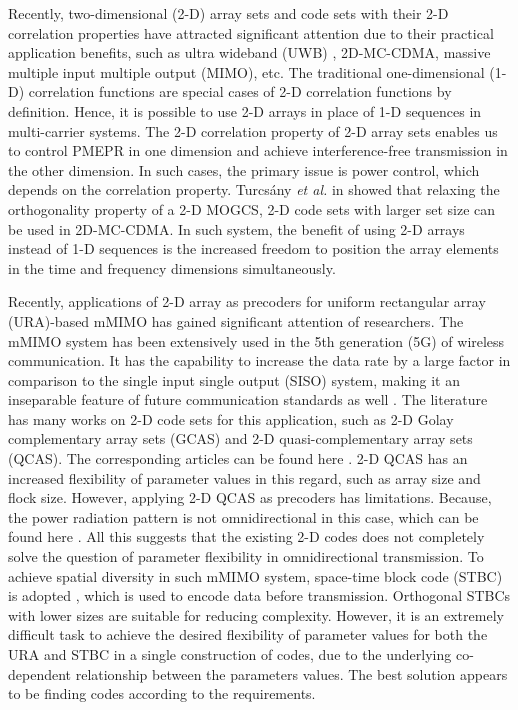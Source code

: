 \documentclass[pdflatex,sn-mathphys-num]{sn-jnl}%
\theoremstyle{thmstyleone}
\begin{document}
	Recently, two-dimensional (2-D) array sets and code sets with their 2-D correlation properties have attracted significant attention due to their practical application benefits, such as ultra wideband (UWB) \cite{Zhang2DMOGCS,XengZCACS}, 2D-MC-CDMA, massive multiple input multiple output (MIMO), etc. The traditional one-dimensional (1-D) correlation functions are special cases of 2-D correlation functions by definition. Hence, it is possible to use 2-D arrays in place of 1-D sequences in multi-carrier systems. The 2-D correlation property of 2-D array sets enables us to control PMEPR in one dimension and achieve interference-free transmission in the other dimension. In such cases, the primary issue is power control, which depends on the correlation property. 
	Turcs{\'a}ny \textit{et al.} in \cite{Turcsny2004New2T,turcsanyQCAS} showed that relaxing the orthogonality property of a 2-D MOGCS, 2-D code sets with larger set size can be used in 2D-MC-CDMA. In such system, the benefit of using 2-D arrays instead of 1-D sequences is the increased freedom to position the array elements in the time and frequency dimensions simultaneously.
	
	Recently, applications of 2-D array as precoders for uniform rectangular array (URA)-based mMIMO \cite{Omni1} has gained significant attention of researchers. The mMIMO system has been extensively used in the 5th generation (5G) of wireless communication. It has the capability to increase the data rate by a large factor in comparison to the single input single output (SISO) system, making it an inseparable feature of future communication standards as well \cite{6Gsurvey}. The literature has many works on 2-D code sets for this application, such as 2-D Golay complementary array sets (GCAS) and 2-D quasi-complementary array sets (QCAS). The corresponding articles can be found here \cite{OmniChen,YuboGCAS,YuboGCAS2,ZilongLiuOmni2024,YuboMIMO2024,YuboQCAS}. 2-D QCAS has an increased flexibility of parameter values in this regard, such as array size and flock size. However, applying 2-D QCAS as precoders has limitations. Because, the power radiation pattern is not omnidirectional in this case, which can be found here \cite{YuboQCAS}. All this suggests that the existing 2-D codes does not completely solve the question of parameter flexibility in omnidirectional transmission. To achieve spatial diversity in such mMIMO system, space-time block code (STBC) is adopted \cite{STBC, OmniChen}, which is used to encode data before transmission. Orthogonal STBCs with lower sizes are suitable for reducing complexity. However, it is an extremely difficult task to achieve the desired flexibility of parameter values for both the URA and STBC  in a single construction of codes, due to the underlying co-dependent relationship between the parameters values. The best solution appears to be finding codes according to the requirements.
	
\end{document}
